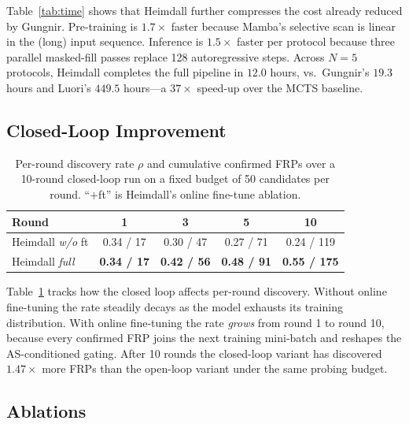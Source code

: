 \documentclass[conference]{IEEEtran}
\begin{document}
Table~\ref{tab:time} shows that Heimdall further compresses the cost
already reduced by Gungnir.  Pre-training is $1.7\times$ faster
because Mamba's selective scan is linear in the (long) input sequence.
Inference is $1.5\times$ faster per protocol because three parallel
masked-fill passes replace 128 autoregressive steps.  Across $N{=}5$
protocols, Heimdall completes the full pipeline in $12.0$ hours, vs.\
Gungnir's $19.3$ hours and Luori's $449.5$ hours---a $37\times$
speed-up over the MCTS baseline.

\subsection{Closed-Loop Improvement}\label{sec:eval-loop}

\begin{table}[t]
\centering
\caption{Per-round discovery rate $\rho$ and cumulative confirmed
FRPs over a 10-round closed-loop run on a fixed budget of 50
candidates per round.  ``$+$ft'' is Heimdall's online fine-tune
ablation.}
\label{tab:loop}
\footnotesize
\begin{tabular}{lcccc}
\toprule
Round & 1 & 3 & 5 & 10\\
\midrule
Heimdall \emph{w/o} ft & 0.34 / 17  & 0.30 / 47  & 0.27 / 71  & 0.24 / 119\\
Heimdall \emph{full}   & \textbf{0.34 / 17} & \textbf{0.42 / 56} & \textbf{0.48 / 91} & \textbf{0.55 / 175}\\
\bottomrule
\end{tabular}
\end{table}

Table~\ref{tab:loop} tracks how the closed loop affects per-round
discovery.  Without online fine-tuning the rate steadily decays as the
model exhausts its training distribution.  With online fine-tuning the
rate \emph{grows} from round 1 to round 10, because every confirmed
FRP joins the next training mini-batch and reshapes the AS-conditioned
gating.  After 10 rounds the closed-loop variant has discovered $1.47
\times$ more FRPs than the open-loop variant under the same probing
budget.

\subsection{Ablations}\label{sec:eval-ablation}
\end{document}
